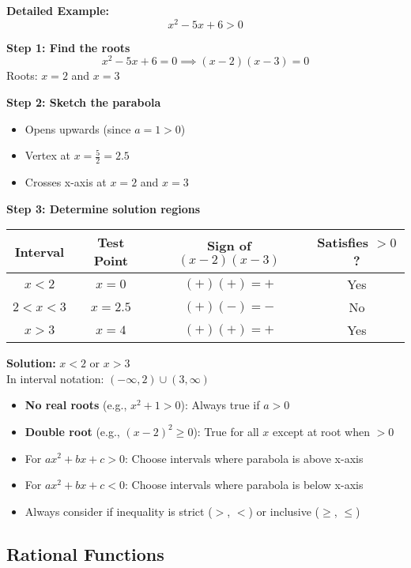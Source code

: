 \documentclass{article} %
\begin{document}
\textbf{Detailed Example:}
\[
x^2 - 5x + 6 > 0
\]

\textbf{Step 1: Find the roots}
\[
x^2 - 5x + 6 = 0 \implies (x-2)(x-3) = 0
\]
Roots: $x=2$ and $x=3$

\textbf{Step 2: Sketch the parabola}
\begin{itemize}
    \item Opens upwards (since $a=1>0$)
    \item Vertex at $x=\frac{5}{2}=2.5$
    \item Crosses x-axis at $x=2$ and $x=3$
\end{itemize}

\textbf{Step 3: Determine solution regions}
\begin{center}
\begin{tabular}{|c|c|c|c|}
\hline
Interval & Test Point & Sign of $(x-2)(x-3)$ & Satisfies $>0$? \\ \hline
$x<2$ & $x=0$ & $(+)(+)=+$ & Yes \\ \hline
$2<x<3$ & $x=2.5$ & $(+)(-)=-$ & No \\ \hline
$x>3$ & $x=4$ & $(+)(+)=+$ & Yes \\ \hline
\end{tabular}
\end{center}

\textbf{Solution:} $x < 2$ or $x > 3$ \\
In interval notation: $(-\infty, 2) \cup (3, \infty)$

\begin{itemize}
    \item \textbf{No real roots} (e.g., $x^2 + 1 > 0$): Always true if $a>0$
    \item \textbf{Double root} (e.g., $(x-2)^2 \geq 0$): True for all $x$ except at root when $>0$
\end{itemize}

\begin{itemize}
    \item For $ax^2 + bx + c > 0$: Choose intervals where parabola is above x-axis
    \item For $ax^2 + bx + c < 0$: Choose intervals where parabola is below x-axis
    \item Always consider if inequality is strict ($>$, $<$) or inclusive ($\geq$, $\leq$)
\end{itemize}

\subsection{Rational Functions}
\end{document}
